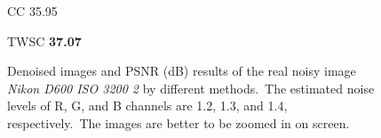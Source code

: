 \begin{figure}
{\begin{minipage}[t]{0.19\textwidth}
{\footnotesize CC 35.95}
\end{minipage}
\begin{minipage}[t]{0.19\textwidth}
\centering
{}
{\footnotesize TWSC \textbf{37.07}}
\end{minipage}
}
    \caption{Denoised images and PSNR (dB) results of the real noisy image \textsl{Nikon D600 ISO 3200 2} \cite{crosschannel2016} by different methods.\ The estimated noise levels of R, G, and B channels are 1.2, 1.3, and 1.4, respectively.\ The images are better to be zoomed in on screen.}
    \label{fig5-12}
\end{figure}



